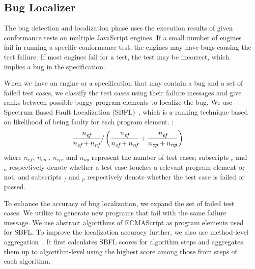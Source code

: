 \subsection{Bug Localizer}

The bug detection and localization phase uses the execution results of
given conformance tests on multiple JavaScript engines.
If a small number of engines fail in running a specific conformance test,
the engines may have bugs causing the test failure.
If most engines fail for a test, the test may be incorrect,
which implies a bug in the specification.

When we have an engine or a specification that may contain a bug and
a set of failed test cases, we classify the test cases using their failure
messages and give ranks between possible buggy program elements to localize the bug.
We use Spectrum Based Fault Localization (SBFL)~\cite{sbfl-survey},
which is a ranking technique based on likelihood of being faulty for each
program element.  :
\[
  {{n_{\mbox{\emph{\scriptsize ef}}}}\over{n_{\mbox{\emph{\scriptsize ef}}} + n_{\mbox{\emph{\scriptsize nf}}}}} /
  \left(
    {{n_{\mbox{\emph{\scriptsize ef}}}}\over{n_{\mbox{\emph{\scriptsize ef}}} + n_{\mbox{\emph{\scriptsize nf}}}}} +
    {{n_{\mbox{\emph{\scriptsize ef}}}}\over{n_{\mbox{\emph{\scriptsize ep}}} + n_{\mbox{\emph{\scriptsize np}}}}}
  \right)
\]
where $n_{ef}$, $n_{ep}$ , $n_{ep}$, and $n_{np}$ represent the number of test
cases; subscripts ${}_e$ and ${}_n$ respectively denote whether a test case touches a
relevant program element or not, and subscripts ${}_f$ and ${}_p$
respectively denote whether the test case is failed or passed.

To enhance the accuracy of bug localization, we expand the set of failed test cases.
We utilize  to generate new programs that fail with the same
failure message.  We use abstract algorithms of ECMAScript as program elements used for SBFL.
To improve the localization accuracy further, we also use method-level aggregation~\cite{fluccs}.
It first calculates SBFL scores for algorithm steps and aggregates them up to
algorithm-level using the highest score among those from steps of each algorithm.
